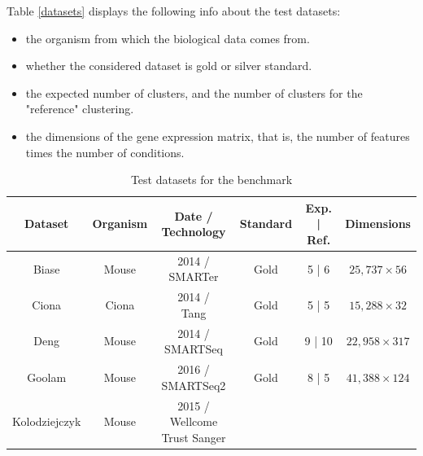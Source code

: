 \documentclass{report}
\begin{document}
{Table \ref{datasets} displays the following info about the test datasets:

\begin{itemize}
\item the organism from which the biological data comes from.
\item whether the considered dataset is gold or silver standard.
\item the expected number of clusters, and the number of clusters for the "reference" clustering.
\item the dimensions of the gene expression matrix, that is, the number of features times the number of conditions.
\end{itemize}

\begin{table}[H]
\centering
\caption{Test datasets for the benchmark}
\begin{tabular}{| c | c | c | c | c | c |}
\hline
\parbox[c]{3cm}{\textbf{Dataset}} & 
\parbox[c]{2cm}{\textbf{Organism}} & 
\parbox[c]{3cm}{\textbf{Date /\\Technology}} & 
\parbox[c]{2cm}{\textbf{Standard}} &
\parbox[c]{2cm}{\textbf{Exp. | Ref.}}&
\parbox[c]{2cm}{\textbf{Dimensions}}\\
\hline
\parbox[c]{3cm}{Biase\cite{biase2014cell}} & 
\parbox[c]{2cm}{Mouse} & 
\parbox[c]{3cm}{2014 /\\SMARTer} & 
\parbox[c]{2cm}{Gold} &
\parbox[c]{2cm}{5 | 6}&
\parbox[c]{2cm}{$25,737 \times 56$}\\
\hline
\parbox[c]{3cm}{Ciona\cite{suyama2016singlecell}}& 
\parbox[c]{2cm}{Ciona}& 
\parbox[c]{3cm}{2014 /\\Tang} & 
\parbox[c]{2cm}{Gold}&
\parbox[c]{2cm}{5 | 5}&
\parbox[c]{2cm}{$15,288 \times 32$}\\
\hline
\parbox[c]{3cm}{Deng\cite{deng2014single}}& 
\parbox[c]{2cm}{Mouse}& 
\parbox[c]{2cm}{2014 /\\SMARTSeq} & 
\parbox[c]{2cm}{Gold}&
\parbox[c]{2cm}{9 | 10}&
\parbox[c]{2cm}{$22,958 \times 317$}\\
\hline
\parbox[c]{3cm}{Goolam\cite{goolam2016heterogeneity}} & 
\parbox[c]{2cm}{Mouse} & 
\parbox[c]{3cm}{2016 /\\SMARTSeq2} & 
\parbox[c]{2cm}{Gold} &
\parbox[c]{2cm}{8 | 5}&
\parbox[c]{2cm}{$41,388 \times 124$}\\
\hline
\parbox[c]{3cm}{Kolodziejczyk\cite{kolodziejczyk2015single}} & 
\parbox[c]{2cm}{Mouse} & 
\parbox[c]{3cm}{2015 /\\Wellcome Trust Sanger} & 

\end{tabular}
\end{table}}
\end{document}
